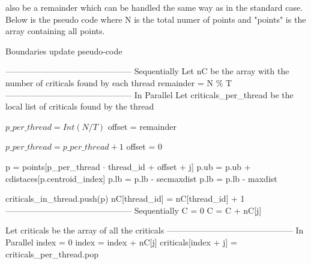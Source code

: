 \documentclass{report}
\begin{document}
\begin{minipage}[b]{0.48\textwidth}
    also be a remainder which can be handled the same way as in the standard case. Below is the pseudo code where N is the total numer of points and "points" is the array containing all points.

    \begin{algorithm}[H]
        \caption{Boundaries update pseudo-code}\label{alg:cap}
        \begin{algorithmic}
          \State --------------------------------------------- \Comment Sequentially
          \State Let nC be the array with the number of criticals found by each thread 
          \State remainder = N \% T
          \State --------------------------------------------- \Comment In Parallel
          \State Let criticals\_per\_thread be the local list of criticals found by the thread
  
          \State$p\_per\_thread = Int(N/T)$
          \State offset = remainder
  
            \State $p\_per\_thread = p\_per\_thread + 1$
            \State offset = 0
          \EndIf
  
          \State
            \State p = points[p\_per\_thread $\cdot$ thread\_id + offset + j]
            \State p.ub = p.ub + cdistaces[p.centroid\_index]
              \State p.lb = p.lb - secmaxdist
            \Else
              \State p.lb = p.lb - maxdist
            \EndIf
  
              \State criticals\_in\_thread.push(p)
              \State nC[thread\_id] = nC[thread\_id] + 1
            \EndIf
          \EndFor
          \State --------------------------------------------- \Comment Sequentially 
          \State C = 0
            \State C = C + nC[j]
          \EndFor
  
          \State Let criticals be the array of all the criticals
          \State --------------------------------------------- \Comment In Parallel 
          \State index = 0
            \State index = index + nC[j]
          \EndFor
          \State 
            \State criticals[index + j] = criticals\_per\_thread.pop 
          \EndFor
        \end{algorithmic}
    \end{algorithm}


\end{minipage}
\end{document}
